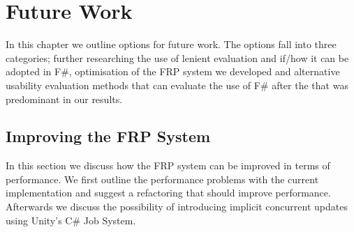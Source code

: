 \chapter{Future Work}
In this chapter we outline options for future work. The options fall into three categories; further researching the use of lenient evaluation and if/how it can be adopted in F\#, optimisation of the \gls{FRP} system we developed and alternative usability evaluation methods that can evaluate the use of F\# after the  that was predominant in our results.


\section{Improving the FRP System}
In this section we discuss how the \gls{FRP} system can be improved in terms of performance. We first outline the performance problems with the current implementation and suggest a refactoring that should improve performance. Afterwards we discuss the possibility of introducing implicit concurrent updates using Unity's C\# Job System.





